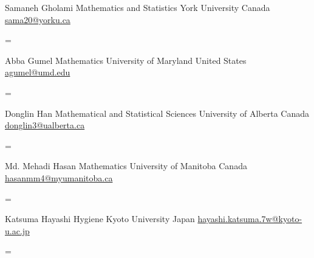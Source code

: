 \documentclass[
  letterpaper,
  DIV=11,
  numbers=noendperiod]{scrartcl}
\newenvironment{absolutelynopagebreak}
  {\par\nobreak\vfil\penalty0\vfilneg
   \vtop\bgroup}
  {\par\xdef\tpd{\the\prevdepth}\egroup
   \prevdepth=\tpd}
\begin{document}
\begin{absolutelynopagebreak}Samaneh   Gholami \newline
\mbox{}\quad  Mathematics and Statistics \newline
\mbox{}\quad  York University \newline
\mbox{}\quad  Canada \newline
\mbox{}\quad \href{mailto: sama20@yorku.ca }{ sama20@yorku.ca }
\end{absolutelynopagebreak}\vskip0.2cm
\begin{absolutelynopagebreak}Abba   Gumel \newline
\mbox{}\quad  Mathematics \newline
\mbox{}\quad  University of Maryland \newline
\mbox{}\quad  United States \newline
\mbox{}\quad \href{mailto: agumel@umd.edu }{ agumel@umd.edu }
\end{absolutelynopagebreak}\vskip0.2cm
\begin{absolutelynopagebreak}Donglin   Han \newline
\mbox{}\quad  Mathematical and Statistical Sciences \newline
\mbox{}\quad  University of Alberta \newline
\mbox{}\quad  Canada \newline
\mbox{}\quad \href{mailto: donglin3@ualberta.ca }{ donglin3@ualberta.ca }
\end{absolutelynopagebreak}\vskip0.2cm
\begin{absolutelynopagebreak}Md. Mehadi   Hasan \newline
\mbox{}\quad  Mathematics \newline
\mbox{}\quad  University of Manitoba \newline
\mbox{}\quad  Canada \newline
\mbox{}\quad \href{mailto: hasanmm4@myumanitoba.ca }{ hasanmm4@myumanitoba.ca }
\end{absolutelynopagebreak}\vskip0.2cm
\begin{absolutelynopagebreak}Katsuma   Hayashi \newline
\mbox{}\quad  Hygiene \newline
\mbox{}\quad  Kyoto University \newline
\mbox{}\quad  Japan \newline
\mbox{}\quad \href{mailto: hayashi.katsuma.7w@kyoto-u.ac.jp }{ hayashi.katsuma.7w@kyoto-u.ac.jp }
\end{absolutelynopagebreak}\vskip0.2cm
\end{document}

